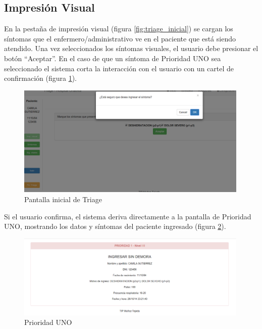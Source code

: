 \subsection{Impresión Visual}
En la pestaña de impresión visual (figura \ref{fig:triage_inicial}) se cargan los síntomas que el enfermero/administrativo ve en el paciente que está siendo atendido. Una vez seleccionados los síntomas visuales, el usuario debe presionar el botón ``Aceptar''. En el caso de que un síntoma de Prioridad UNO sea seleccionado el sistema corta la interacción con el usuario con un cartel de confirmación (figura \ref{fig:impresion_visual_p1}).
\begin{figure}
\centerline{\includegraphics[width=0.99\textwidth]{impresion_visual_p1.png}}
\caption{Pantalla inicial de Triage} \label{fig:impresion_visual_p1}
\end{figure}
Si el usuario confirma, el sistema deriva directamente a la pantalla de Prioridad UNO, mostrando los datos y síntomas del paciente ingresado (figura \ref{fig:prioridad_uno}).
\begin{figure}
\centerline{\includegraphics[width=0.99\textwidth]{prioridad_uno.png}}
\caption{Prioridad UNO} \label{fig:prioridad_uno}
\end{figure}

